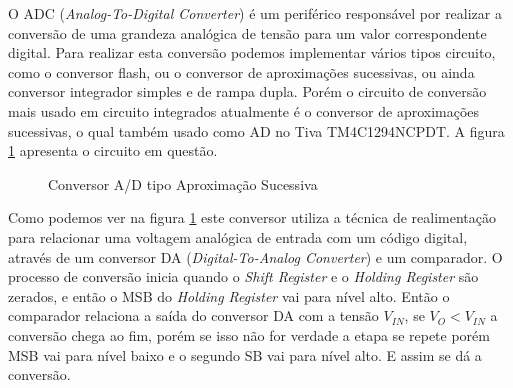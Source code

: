O ADC (\emph{Analog-To-Digital Converter}) é um periférico responsável por realizar a conversão de uma grandeza analógica de tensão para um valor correspondente digital. Para realizar esta conversão podemos implementar vários  tipos circuito, como o conversor flash, ou o conversor de aproximações sucessivas, ou ainda conversor integrador simples e de rampa dupla. Porém o  circuito de conversão mais usado em circuito integrados atualmente é o conversor de aproximações sucessivas, o qual também usado como AD no Tiva TM4C1294NCPDT. A figura \ref{fig:ConversorAD} apresenta o circuito em questão.


\begin{figure}[H]
	\centering
	\caption{Conversor A/D tipo Aproximação Sucessiva}
	\label{fig:ConversorAD}
\end{figure}

Como podemos ver na figura \ref{fig:ConversorAD} este conversor utiliza a técnica de realimentação para relacionar uma voltagem analógica de entrada com um código digital, através de um conversor DA (\emph{Digital-To-Analog Converter}) e um comparador. O processo de conversão inicia quando o \emph{Shift Register} e o \emph{Holding Register} são zerados, e então o MSB do \emph{Holding Register} vai para nível alto. Então o comparador relaciona a saída do conversor DA com a tensão $V_{IN}$, se $V_{O} < V_{IN}$ a conversão chega ao fim, porém se isso não for verdade a etapa se repete porém MSB vai para nível baixo e o segundo SB vai para nível alto. E assim se dá a conversão. 



